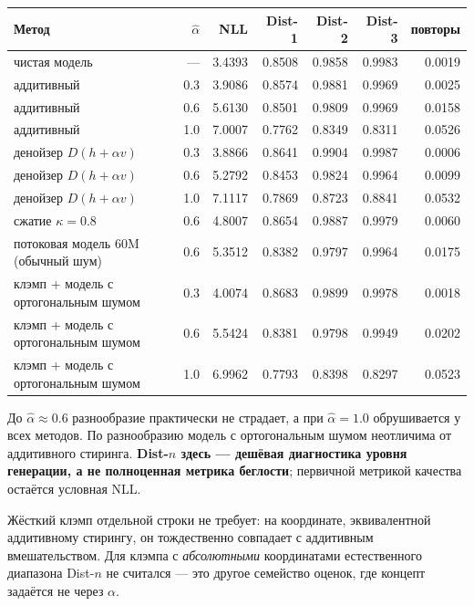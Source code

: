 \documentclass[10pt,a4paper]{article}
\newcommand{\ahat}{\hat{\alpha}}
\begin{document}
\begin{center}\small
\begin{tabular}{@{}lrrrrrr@{}}
\toprule
Метод & $\ahat$ & NLL & Dist-1 & Dist-2 & Dist-3 & повторы\\
\midrule
чистая модель & — & 3.4393 & 0.8508 & 0.9858 & 0.9983 & 0.0019\\
аддитивный & 0.3 & 3.9086 & 0.8574 & 0.9881 & 0.9969 & 0.0025\\
аддитивный & 0.6 & 5.6130 & 0.8501 & 0.9809 & 0.9969 & 0.0158\\
аддитивный & 1.0 & 7.0007 & 0.7762 & 0.8349 & 0.8311 & 0.0526\\
денойзер $D(h{+}\alpha v)$ & 0.3 & 3.8866 & 0.8641 & 0.9904 & 0.9987 & 0.0006\\
денойзер $D(h{+}\alpha v)$ & 0.6 & 5.2792 & 0.8453 & 0.9824 & 0.9964 & 0.0099\\
денойзер $D(h{+}\alpha v)$ & 1.0 & 7.1117 & 0.7869 & 0.8723 & 0.8841 & 0.0532\\
сжатие $\kappa{=}0.8$ & 0.6 & 4.8007 & 0.8654 & 0.9887 & 0.9979 & 0.0060\\
потоковая модель 60M (обычный шум) & 0.6 & 5.3512 & 0.8382 & 0.9797 & 0.9964 & 0.0175\\
клэмп + модель с ортогональным шумом & 0.3 & 4.0074 & 0.8683 & 0.9899 & 0.9978 & 0.0018\\
клэмп + модель с ортогональным шумом & 0.6 & 5.5424 & 0.8381 & 0.9798 & 0.9949 & 0.0202\\
клэмп + модель с ортогональным шумом & 1.0 & 6.9962 & 0.7793 & 0.8398 & 0.8297 & 0.0523\\
\bottomrule
\end{tabular}
\end{center}

\medskip
До $\ahat \approx 0.6$ разнообразие практически не страдает, а при $\ahat = 1.0$
обрушивается у всех методов. По разнообразию модель с ортогональным шумом неотличима от
аддитивного стиринга. \textbf{Dist-$n$ здесь — дешёвая диагностика уровня генерации, а не
полноценная метрика беглости}; первичной метрикой качества остаётся условная NLL.

Жёсткий клэмп отдельной строки не требует: на координате, эквивалентной аддитивному стирингу,
он тождественно совпадает с аддитивным вмешательством. Для клэмпа с \emph{абсолютными} координатами
естественного диапазона Dist-$n$ не считался — это другое семейство оценок, где
концепт задаётся не через $\alpha$.

\end{document}
